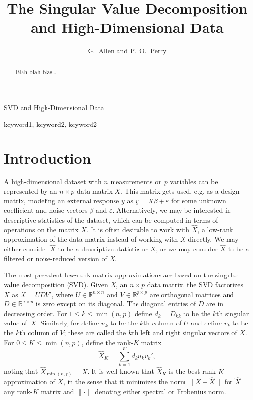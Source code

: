 \documentclass{eoeauth}
\newcommand{\reals}{\mathbb{R}}
\begin{document}
\title{The Singular Value Decomposition and High-Dimensional Data}{SVD and
High-Dimensional Data}

\author{G.\ Allen and P.\ O.\ Perry}


\begin{abstract}
Blah blah blas\ldots
\end{abstract}

\begin{keywords}
keyword1, keyword2, keyword2
\end{keywords}

\section{Introduction}

A high-dimensional dataset with $n$ measurements on $p$ variables can
be represented by an $n \times p$ data matrix $X$.  This matrix gets
used, e.g. as a design matrix, modeling an external response $y$ as $y
= X \beta + \varepsilon$ for some unknown coefficient and noise vectors
$\beta$ and $\varepsilon$.  Alternatively, we may be interested in
descriptive statistics of the dataset, which can be computed in terms
of operations on the matrix $X$.  It is often desirable to work with
$\hat X$, a low-rank approximation of the data matrix instead
of working with $X$ directly.  We may either consider $\hat X$ to be a
descriptive statistic or $X$, or we may consider $\hat X$ to be a
filtered or noise-reduced version of $X$.

The most prevalent low-rank matrix approximations are based on the
singular value decomposition (SVD).  Given $X$, an $n \times p$ data
matrix, the SVD factorizes $X$ as $X = U D V'$, where
$U \in \reals^{n \times n}$ and $V \in \reals^{p \times p}$ are
orthogonal matrices and $D \in \reals^{n \times p}$ is zero except on
its diagonal.  The diagonal entries of $D$ are in decreasing order.
For $1 \leq k \leq \min(n,p)$ define $d_k = D_{kk}$ to be the $k$th
singular value of~$X$.  Similarly, for define $u_k$ to be the $k$th
column of $U$ and define $v_k$ to be the $k$th column of $V$; these
are called the $k$th left and right singular vectors of $X$.  For
$0 \leq K \leq \min(n,p)$, define the rank-$K$ matrix
\[
  \hat X_K = \sum_{k=1}^{K} d_k u_k v_k',
\]
noting that $\hat X_{\min(n,p)} = X$.  It is well known that $\hat
X_K$ is the best rank-$K$ approximation of $X$, in the sense that it
minimizes the norm $\| X - \hat X \|$ for $\hat X$ any rank-$K$ matrix
and $\| \cdot \|$ denoting either spectral or Frobenius norm.
\end{document}
